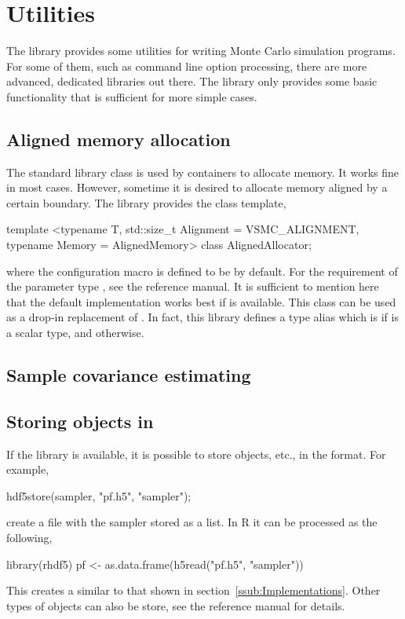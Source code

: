 \section{Utilities}
\label{sec:Utilities}

The library provides some utilities for writing Monte Carlo simulation
programs. For some of them, such as command line option processing, there are
more advanced, dedicated libraries out there. The library only provides some
basic functionality that is sufficient for more simple cases.

\subsection{Aligned memory allocation}
\label{sub:Aligned memory allocation}

The standard library class  is used by containers to
allocate memory. It works fine in most cases. However, sometime it is desired
to allocate memory aligned by a certain boundary. The library provides the
class template,
\begin{cppcode}
  template <typename T, std::size_t Alignment = VSMC_ALIGNMENT,
  typename Memory = AlignedMemory>
  class AlignedAllocator;
\end{cppcode}
where the configuration macro  is defined to be
 by default. For the requirement of the parameter type
, see the reference manual. It is sufficient to mention here
that the default implementation works best if \tbb is available. This class can
be used as a drop-in replacement of . In fact,
this library defines a type alias  which is
 if  is a scalar
type, and  otherwise.

\subsection{Sample covariance estimating}
\label{sub:Sample covariance estimating}

\subsection{Storing objects in \protect\hdf}
\label{sub:Storing objects in HDF5}

If the \hdf library is available, it is possible to store
 objects, etc., in the \hdf format. For example,
\begin{cppcode}
  hdf5store(sampler, "pf.h5", "sampler");
\end{cppcode}
create a \hdf file with the sampler stored as a list. In R it can be processed
as the following,
\begin{rcode}
  library(rhdf5)
  pf <- as.data.frame(h5read("pf.h5", "sampler"))
\end{rcode}
This creates a  similar to that shown in
section~\ref{ssub:Implementations}. Other types of objects can also be store,
see the reference manual for details.

